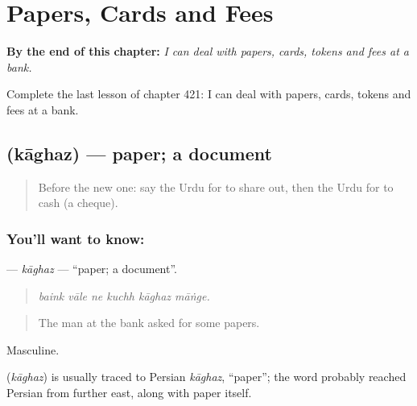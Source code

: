 
\chapter{Papers, Cards and Fees}
\label{ch:ur-papers-cards-and-fees}

\begin{chapteropening}
\textbf{By the end of this chapter:} \emph{I can deal with papers, cards, tokens and fees at a bank.}

Complete the last lesson of chapter 421: I can deal with papers, cards, tokens and fees at a bank.
\end{chapteropening}

\section[\texorpdfstring{\ur{کاغذ} (kāghaz)}{کاغذ (kāghaz)}]{ (kāghaz) — paper; a document}

\label{lesson:UR-C421-kaghaz}



\begin{quote}
Before the new one: say the Urdu for to share out, then the Urdu for to cash (a cheque).
\end{quote}

\subsection*{You'll want to know: }
\textbf{} — \emph{kāghaz} — \textquotedblleft{}paper; a document\textquotedblright{}.

\begin{quote}
     
\end{quote}

\begin{quote}
\emph{baink vāle ne kuchh kāghaz māṅge.}
\end{quote}

\begin{quote}
The man at the bank asked for some papers.
\end{quote}

Masculine.

\begin{cousinweb}
\textbf{} (\emph{kāghaz}) is usually traced to Persian \emph{kāghaz}, \textquotedblleft{}paper\textquotedblright{}; the word probably reached Persian from further east, along with paper itself.
\end{cousinweb}

